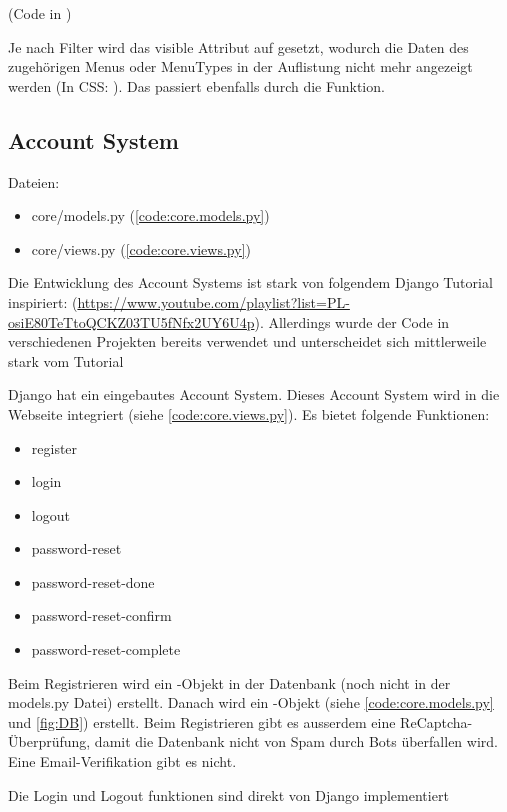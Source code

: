(Code in )

Je nach Filter wird das visible Attribut auf  gesetzt, wodurch die
Daten des zugehörigen Menus oder MenuTypes in der Auflistung nicht mehr
angezeigt werden (In CSS: ). Das passiert ebenfalls durch
die  Funktion.

\subsection{Account System} \label{spez:Account}

Dateien:
\begin{itemize}
    \item core/models.py (\ref{code:core.models.py})
    \item core/views.py (\ref{code:core.views.py})
\end{itemize}

Die Entwicklung des Account Systems ist stark von folgendem Django Tutorial
inspiriert:
(\url{https://www.youtube.com/playlist?list=PL-osiE80TeTtoQCKZ03TU5fNfx2UY6U4p}).
Allerdings wurde der Code in verschiedenen Projekten bereits verwendet und
unterscheidet sich mittlerweile stark vom Tutorial

Django hat ein eingebautes Account System. Dieses Account System wird in die
Webseite integriert (siehe \ref{code:core.views.py}). Es bietet folgende
Funktionen:
\begin{itemize}
    \item register
    \item login
    \item logout
    \item password-reset
    \item password-reset-done
    \item password-reset-confirm
    \item password-reset-complete
\end{itemize}

Beim Registrieren wird ein -Objekt in der Datenbank (noch nicht in
der models.py Datei) erstellt. Danach wird ein -Objekt (siehe
\ref{code:core.models.py} und \ref{fig:DB}) erstellt. Beim Registrieren gibt es
ausserdem eine ReCaptcha-Überprüfung, damit die Datenbank nicht von Spam durch
Bots überfallen wird. Eine Email-Verifikation gibt es nicht.

Die Login und Logout funktionen sind direkt von Django implementiert

